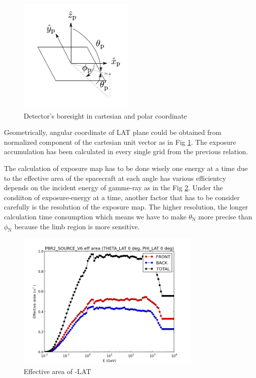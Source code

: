 \begin{figure}[h!]
    \centering
    \includegraphics[width=0.5\textwidth]{img/fig_coordinate/coord_plane.pdf}
    \caption{Detector's boresight in cartesian and polar coordinate}
    \label{fig:tf_lat_pol_car}
\end{figure}

Geometrically, angular coordinate of LAT plane could be obtained from normalized component of the cartesian unit vector as in Fig \ref{fig:tf_lat_pol_car}.
The exposure accumulation has been calculated in every single grid from the previous relation.

The calculation of exposure map has to be done wisely one energy at a time
due to the effective area of the spacecraft at each angle has various efficientcy depends on the incident energy of gamme-ray as in the Fig \ref{fig:lateff}.
Under the condiiton of exposure-energy at a time, another factor that has to be consider carefully is the resolution of the exposure map.
The higher resolution, the longer calculation time consumption which means we have to make $\theta_\text{N}$ more precise than $\phi_\text{N}$ because the limb region is more sensitive.

\begin{figure}[h!]
    \centering
    \includegraphics[width=0.8\textwidth]{img/eff_energy_dist}
    \caption{Effective area of -LAT}
    \label{fig:lateff}
\end{figure}

